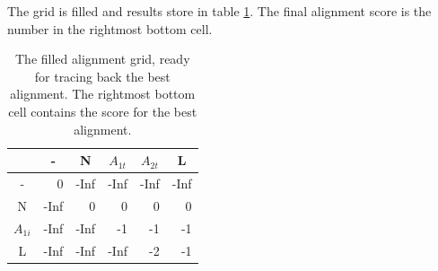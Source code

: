 The grid is filled and results store in table \ref{NW_full_table}.
The final alignment score is the number in the rightmost bottom cell.
\begin{table}[ht!]
\centering
\begin{tabular}{c|r|r|r|r|r|}
\rowcolor[HTML]{EFEFEF}
                                 & \multicolumn{1}{c|}{\cellcolor[HTML]{EFEFEF}-} & \multicolumn{1}{c|}{\cellcolor[HTML]{EFEFEF}N} & \multicolumn{1}{c|}{\cellcolor[HTML]{EFEFEF}$A_{1t}$} & \multicolumn{1}{c|}{\cellcolor[HTML]{EFEFEF}$A_{2t}$} & \multicolumn{1}{c|}{\cellcolor[HTML]{EFEFEF}L} \\ \hline
\cellcolor[HTML]{EFEFEF}-        & 0                                              & -Inf                                            & -Inf                                                   & -Inf                                                   & -Inf                                            \\ \hline
\cellcolor[HTML]{EFEFEF}N        & -Inf                                            & 0                                              & 0                                                   & 0                                                   & 0                                            \\ \hline
\cellcolor[HTML]{EFEFEF}$A_{1i}$ & -Inf                                            & -Inf                                            & -1                                                     & -1                                                   & -1                                            \\ \hline
\cellcolor[HTML]{EFEFEF}L        & -Inf                                            & -Inf                                            & -Inf                                                   & -2                                                    & -1                                            \\ \hline
\end{tabular}
    \caption{
         \label{NW_full_table}
             The filled alignment grid, ready for tracing back the best alignment.
             The rightmost bottom cell contains the score for the best alignment.
             }
\end{table}

